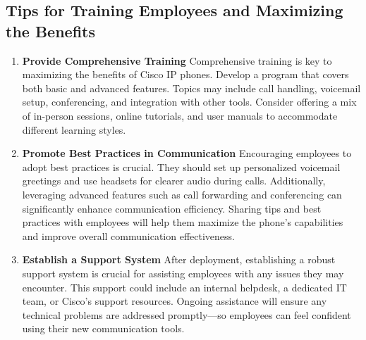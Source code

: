 \documentclass[11pt,a4paper]{article}
\begin{document}
\subsection*{Tips for Training Employees and Maximizing the Benefits}
\begin{enumerate}
  \item \textbf{Provide Comprehensive Training} Comprehensive training is key to maximizing the benefits of Cisco IP phones. Develop a program that covers both basic and advanced features. Topics may include call handling, voicemail setup, conferencing, and integration with other tools. Consider offering a mix of in-person sessions, online tutorials, and user manuals to accommodate different learning styles.
  
  \item \textbf{Promote Best Practices in Communication} Encouraging employees to adopt best practices is crucial. They should set up personalized voicemail greetings and use headsets for clearer audio during calls. Additionally, leveraging advanced features such as call forwarding and conferencing can significantly enhance communication efficiency. Sharing tips and best practices with employees will help them maximize the phone’s capabilities and improve overall communication effectiveness.

  \item \textbf{Establish a Support System} After deployment, establishing a robust support system is crucial for assisting employees with any issues they may encounter. This support could include an internal helpdesk, a dedicated IT team, or Cisco’s support resources. Ongoing assistance will ensure any technical problems are addressed promptly—so employees can feel confident using their new communication tools.
  
\end{enumerate}
\end{document}
